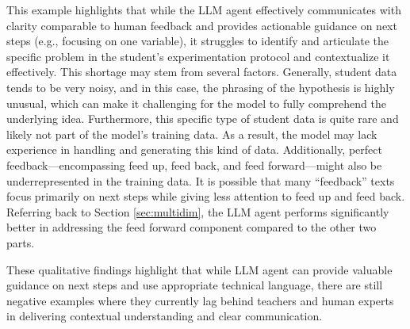 
This example highlights that while the LLM agent effectively communicates with clarity comparable to human feedback and provides actionable guidance on next steps (e.g., focusing on one variable), it struggles to identify and articulate the specific problem in the student’s experimentation protocol and contextualize it effectively. 
%
This shortage may stem from several factors. Generally, student data tends to be very noisy, and in this case, the phrasing of the hypothesis is highly unusual, which can make it challenging for the model to fully comprehend the underlying idea. Furthermore, this specific type of student data is quite rare and likely not part of the model's training data. As a result, the model may lack experience in handling and generating this kind of data. Additionally, perfect feedback—encompassing feed up, feed back, and feed forward—might also be underrepresented in the training data. It is possible that many ``feedback'' texts focus primarily on next steps while giving less attention to feed up and feed back. Referring back to Section \ref{sec:multidim}, the LLM agent performs significantly better in addressing the feed forward component compared to the other two parts.
%

These qualitative findings highlight that while LLM agent can provide valuable guidance on next steps and use appropriate technical language, there are still negative examples where they currently lag behind teachers and human experts in delivering contextual understanding and clear communication.


